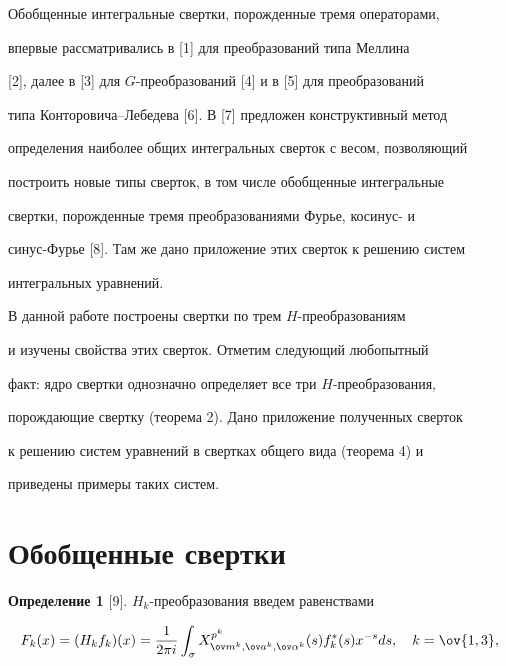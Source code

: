 \maketitle 


\label{begin} 


 


Обобщенные интегральные свертки, порожденные тремя операторами, 


впервые рассматривались в [1] для преобразований типа Меллина 


[2], далее в [3] для $G$-преобразований [4] и в [5] для преобразований 


типа Конторовича--Лебедева [6]. В [7] предложен конструктивный метод 


определения наиболее общих интегральных сверток с весом, позволяющий 


построить новые типы сверток, в том числе обобщенные интегральные 


свертки, порожденные тремя преобразованиями Фурье, косинус- и 


синус-Фурье [8]. Там же дано приложение этих сверток к решению систем 


интегральных уравнений. 


 


В данной работе построены свертки по трем $H$-преобразованиям 


и изучены свойства этих сверток. Отметим следующий любопытный 


факт: ядро свертки однозначно определяет все три $H$-преобразования, 


порождающие свертку (теорема 2). Дано приложение полученных сверток 


к решению систем уравнений в свертках общего вида (теорема 4) и 


приведены примеры таких систем. 


 


\section{Обобщенные свертки} 


 


{\bf Определение 1} [9]. $H_k$-преобразования введем равенствами 


\begin{equation} 


F_k(x)=(H_k f_k)(x)=\frac{1}{2\pi i} 


\int_\sigma X^{p^k}_{\ov m^k,\ov a^k,\ov\alpha^k}(s) 


f^*_k(s)x^{-s}ds,\quad k=\ov{1,3}, 


\end{equation} 


